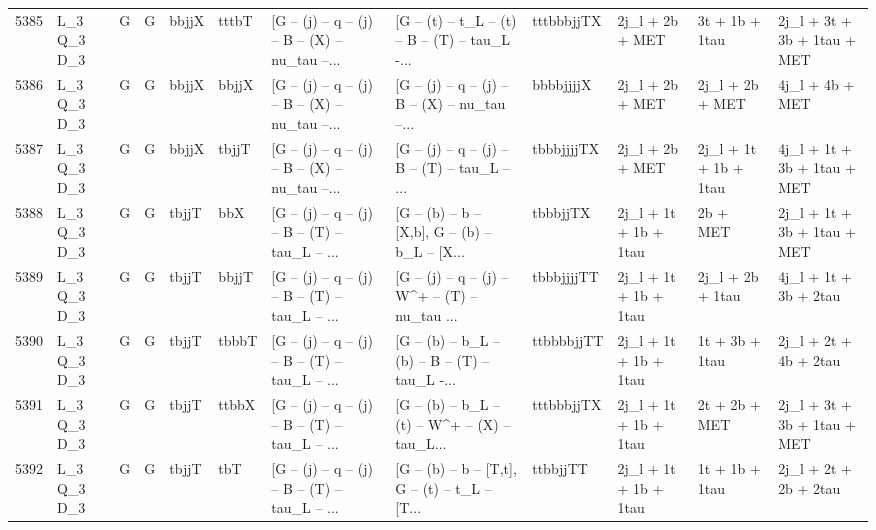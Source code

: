 \begin{tabular}{llllllllllll}
5385 &  L\_3 Q\_3 D\_3 &     G &     G &       bbjjX &       tttbT &  [G -- (j) -- q -- (j) -- B -- (X) -- nu\_tau --... &  [G -- (t) -- t\_L -- (t) -- B -- (T) -- tau\_L -... &  tttbbbjjTX &          2j\_l + 2b + MET &           3t + 1b + 1tau &        2j\_l + 3t + 3b + 1tau + MET \\
5386 &  L\_3 Q\_3 D\_3 &     G &     G &       bbjjX &       bbjjX &  [G -- (j) -- q -- (j) -- B -- (X) -- nu\_tau --... &  [G -- (j) -- q -- (j) -- B -- (X) -- nu\_tau --... &   bbbbjjjjX &          2j\_l + 2b + MET &          2j\_l + 2b + MET &                    4j\_l + 4b + MET \\
5387 &  L\_3 Q\_3 D\_3 &     G &     G &       bbjjX &       tbjjT &  [G -- (j) -- q -- (j) -- B -- (X) -- nu\_tau --... &  [G -- (j) -- q -- (j) -- B -- (T) -- tau\_L -- ... &  tbbbjjjjTX &          2j\_l + 2b + MET &    2j\_l + 1t + 1b + 1tau &        4j\_l + 1t + 3b + 1tau + MET \\
5388 &  L\_3 Q\_3 D\_3 &     G &     G &       tbjjT &         bbX &  [G -- (j) -- q -- (j) -- B -- (T) -- tau\_L -- ... &  [G -- (b) -- b -- [X,b], G -- (b) -- b\_L -- [X... &    tbbbjjTX &    2j\_l + 1t + 1b + 1tau &                 2b + MET &        2j\_l + 1t + 3b + 1tau + MET \\
5389 &  L\_3 Q\_3 D\_3 &     G &     G &       tbjjT &       bbjjT &  [G -- (j) -- q -- (j) -- B -- (T) -- tau\_L -- ... &  [G -- (j) -- q -- (j) -- W\textasciicircum + -- (T) -- nu\_tau ... &  tbbbjjjjTT &    2j\_l + 1t + 1b + 1tau &         2j\_l + 2b + 1tau &              4j\_l + 1t + 3b + 2tau \\
5390 &  L\_3 Q\_3 D\_3 &     G &     G &       tbjjT &       tbbbT &  [G -- (j) -- q -- (j) -- B -- (T) -- tau\_L -- ... &  [G -- (b) -- b\_L -- (b) -- B -- (T) -- tau\_L -... &  ttbbbbjjTT &    2j\_l + 1t + 1b + 1tau &           1t + 3b + 1tau &              2j\_l + 2t + 4b + 2tau \\
5391 &  L\_3 Q\_3 D\_3 &     G &     G &       tbjjT &       ttbbX &  [G -- (j) -- q -- (j) -- B -- (T) -- tau\_L -- ... &  [G -- (b) -- b\_L -- (t) -- W\textasciicircum + -- (X) -- tau\_L... &  tttbbbjjTX &    2j\_l + 1t + 1b + 1tau &            2t + 2b + MET &        2j\_l + 3t + 3b + 1tau + MET \\
5392 &  L\_3 Q\_3 D\_3 &     G &     G &       tbjjT &         tbT &  [G -- (j) -- q -- (j) -- B -- (T) -- tau\_L -- ... &  [G -- (b) -- b -- [T,t], G -- (t) -- t\_L -- [T... &    ttbbjjTT &    2j\_l + 1t + 1b + 1tau &           1t + 1b + 1tau &              2j\_l + 2t + 2b + 2tau \\

\end{tabular}

